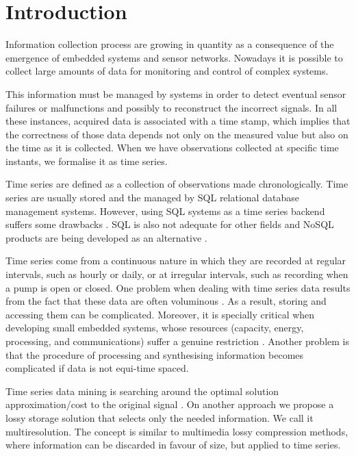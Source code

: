 


\section{Introduction}

Information collection process are growing in quantity as a
consequence of the emergence of embedded systems and sensor networks.
Nowadays it is possible to collect large amounts of data for
monitoring and control of complex systems.

This information must be managed by systems in order to detect
eventual sensor failures or malfunctions and possibly to reconstruct
the incorrect signals. In all these instances, acquired data is
associated with a time stamp, which implies that the correctness of
those data depends not only on the measured value but also on the time
as it is collected. When we have observations collected at specific
time instants, we formalise it as time series.

Time series are defined as a collection of observations made
chronologically. Time series are usually stored and the
managed by SQL relational database management systems. However, using
SQL systems as a time series backend suffers some drawbacks
\cite{dreyer94,schmidt95,stonebraker09:scidb,zhang11}. SQL is also not
adequate for other fields and NoSQL products are being developed as an
alternative \cite{atzeni13:relational_model_dead,stonebraker10}.

Time series come from a continuous nature in which they are recorded
at regular intervals, such as hourly or daily, or at irregular
intervals, such as recording when a pump is open or closed.  One
problem when dealing with time series data results from the fact that
these data are often voluminous \cite{fu11,keogh08:isax}. As a result,
storing and accessing them can be complicated. Moreover, it is
specially critical when developing small embedded systems, whose
resources (capacity, energy, processing, and communications) suffer a
genuine restriction \cite{yaogehrke02}.  Another problem is that the
procedure of processing and synthesising information becomes
complicated if data is not equi-time spaced.


Time series data mining is searching around the optimal solution
approximation/cost to the original signal \cite{fu11,keogh01}. On
another approach we propose a lossy storage solution that selects only
the needed information. We call it multiresolution. The concept is
similar to multimedia lossy compression methods, where information can
be discarded in favour of size, but applied to time series.



